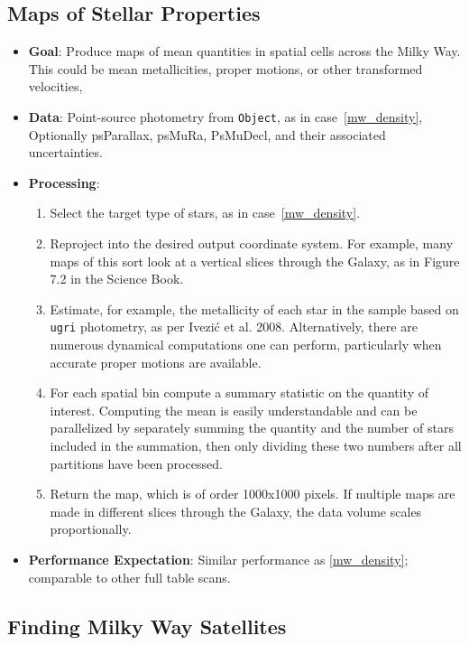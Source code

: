 \documentclass[DM,authoryear,toc]{lsstdoc}
\begin{document}
\subsection{Maps of Stellar Properties}

\begin{itemize}
  \item \textbf{Goal}: Produce maps of mean quantities in spatial cells across
  the Milky Way. This could be mean metallicities, proper motions, or other
  transformed velocities,
  \item \textbf{Data}: Point-source photometry from \texttt{Object}, as in
  case~\ref{mw_density}, Optionally psParallax, psMuRa, PsMuDecl, and their
  associated uncertainties.
  \item \textbf{Processing}:
    \begin{enumerate}
      \item Select the target type of stars, as in case~\ref{mw_density}.
      \item Reproject into the desired output coordinate system. For example,
      many maps of this sort look at a vertical slices through the Galaxy, as in
      Figure 7.2 in the Science Book.
      \item Estimate, for example, the metallicity of each star in the sample
      based on \texttt{ugri} photometry, as per Ivezi\'{c} et al. 2008.
      Alternatively, there are numerous dynamical computations one can perform,
      particularly when accurate proper motions are available.
      \item For each spatial bin compute a summary statistic on the quantity of
      interest. Computing the mean is easily understandable and can be
      parallelized by separately summing the quantity and the number of stars
      included in the summation, then only dividing these two numbers after all
      partitions have been processed.
      \item Return the map, which is of order 1000x1000 pixels. If multiple maps
      are made in different slices through the Galaxy, the data volume scales proportionally.
    \end{enumerate}
    \item \textbf{Performance Expectation}: Similar performance as
    \ref{mw_density}; comparable to other full table scans.
\end{itemize}

\subsection{Finding Milky Way Satellites}
\label{mw_sats}
\end{document}

